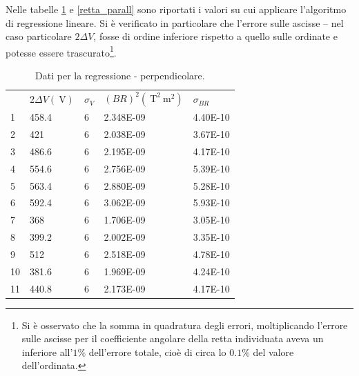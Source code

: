 \documentclass[a4paper,11pt]{article}
\begin{document}
		Nelle tabelle \ref{retta_perp} e \ref{retta_parall} sono riportati i valori su cui applicare l'algoritmo di regressione lineare. Si è verificato in particolare che l'errore sulle ascisse -- nel caso particolare $2\Delta V$, fosse di ordine inferiore rispetto a quello sulle ordinate e potesse essere trascurato\footnote{Si è osservato che la somma in quadratura degli errori, moltiplicando l'errore sulle ascisse per il coefficiente angolare della retta individuata aveva un inferiore all'$1\%$ dell'errore totale, cioè di circa lo $0.1\%$ del valore dell'ordinata.}. 
		
		
		\begin{table}[htpb]
			\centering
			\caption{Dati per la regressione - perpendicolare.}
			\label{retta_perp}
			\begin{tabular}{lllll}
				\rowcolor[HTML]{BBDAFF} 
				& $2\Delta V (\SI{}{\volt})$ & $\sigma_V$ & $(B R)^2 (\SI{}{\tesla}^2\SI{}{\meter}^2)$ & $\sigma_{BR}$  \\
				\rowcolor[HTML]{C0C0C0} 
				\cellcolor[HTML]{BBDAFF}1  & 458.4          & 6          & 2.348E-09                                                & 4.40E-10  \\
				\rowcolor[HTML]{EFEFEF} 
				\cellcolor[HTML]{BBDAFF}2  & 421            & 6          & 2.038E-09                                                & 3.67E-10  \\
				\rowcolor[HTML]{C0C0C0} 
				\cellcolor[HTML]{BBDAFF}3  & 486.6          & 6          & 2.195E-09                                                & 4.17E-10  \\
				\rowcolor[HTML]{EFEFEF} 
				\cellcolor[HTML]{BBDAFF}4  & 554.6          & 6          & 2.756E-09                                                & 5.39E-10  \\
				\rowcolor[HTML]{C0C0C0} 
				\cellcolor[HTML]{BBDAFF}5  & 563.4          & 6          & 2.880E-09                                                & 5.28E-10  \\
				\rowcolor[HTML]{EFEFEF} 
				\cellcolor[HTML]{BBDAFF}6  & 592.4          & 6          & 3.062E-09                                                & 5.93E-10  \\
				\rowcolor[HTML]{C0C0C0} 
				\cellcolor[HTML]{BBDAFF}7  & 368            & 6          & 1.706E-09                                                & 3.05E-10  \\
				\rowcolor[HTML]{EFEFEF} 
				\cellcolor[HTML]{BBDAFF}8  & 399.2          & 6          & 2.002E-09                                                & 3.35E-10  \\
				\rowcolor[HTML]{C0C0C0} 
				\cellcolor[HTML]{BBDAFF}9  & 512            & 6          & 2.518E-09                                                & 4.78E-10  \\
				\rowcolor[HTML]{EFEFEF} 
				\cellcolor[HTML]{BBDAFF}10 & 381.6          & 6          & 1.969E-09                                                & 4.24E-10  \\
				\rowcolor[HTML]{C0C0C0} 
				\cellcolor[HTML]{BBDAFF}11 & 440.8          & 6          & 2.173E-09                                                & 4.17E-10  
			\end{tabular}
		\end{table}
		
\end{document}
